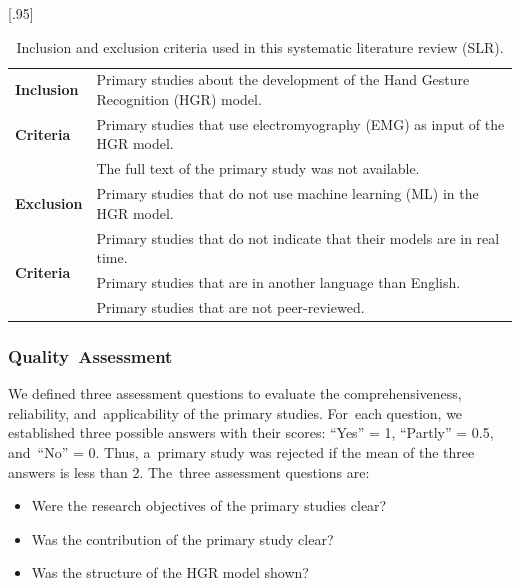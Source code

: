 \documentclass[sensors,review,accept,moreauthors,pdftex]{Definitions/mdpi}
\begin{document}
\begin{table}[H]
	\caption{Inclusion and exclusion criteria used in this systematic literature review (SLR).}
	\label{tab:3}
	\centering
	\scalebox{.95}[.95]{\begin{tabular}{ll}
		\toprule
		\textbf{Inclusion}&Primary studies about the development of the Hand Gesture Recognition (HGR) model.\\ 
		\textbf{Criteria}&Primary studies that use electromyography (EMG) as input of the HGR model.\\
		\midrule
		&The full text of the primary study was not available.\\
		\textbf{Exclusion}&Primary studies that do not use machine learning (ML) in the HGR model.\\ 
	\multirow{3}{*}{\textbf{Criteria}}&Primary studies that do not indicate that their models are in real time.\\ 
		&Primary studies that are in another language than English.\\ 
		&Primary studies that are not peer-reviewed.\\
		
		\bottomrule
	\end{tabular}}
\end{table}
\unskip





\subsubsection{Quality~Assessment} \label{sec:2.3.2}

We defined three assessment questions to evaluate the comprehensiveness, reliability, and~applicability of the primary studies. For~each question, we established three possible answers with their scores: “Yes” = 1, “Partly” = 0.5, and~“No” = 0. Thus, a~primary study was rejected if the mean of the three answers is less than 2. The~three assessment questions are:

\begin{itemize} 
	
	\item Were the research objectives of the primary studies clear?
	\item Was the contribution of the primary study clear?
	\item Was the structure of the HGR model shown?
\end{itemize}
\end{document}

